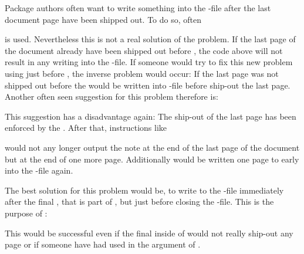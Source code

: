 \begin{Declaration}
\end{Declaration}%
Package authors often want to write something into the -file after
the last document page have been shipped out. To do so, often
\begin{lstcode}
  \AtEndDocument{%
    \if@filesw
      \write\@auxout{%
        \protect\writethistoaux%
      }%
    \fi
  } 
\end{lstcode}
is used. Nevertheless this is not a real solution of the problem. If the last
page of the document already have been shipped out before
, the code above will not result in any
writing into the -file. If someone would try to fix this new problem
using  just before , the inverse problem would
occur: If the last page was not shipped out before
 the  would be written
into -file before ship-out the last page. Another often seen
suggestion for this problem therefore is:
\begin{lstcode}
  \AtEndDocument{%
    \if@filesw
      \clearpage
      \immediate\write\@auxout{%
        \protect\writethistoaux%
      }%
    \fi
  } 
\end{lstcode}
This suggestion has a disadvantage again: The ship-out of the last page has
been enforced by the . After that, instructions like
\begin{lstcode}
\end{lstcode}
would not any longer output the note at the end of the last page of the
document but at the end of one more page. Additionally 
would be written one page to early into the -file again.

The best solution for this problem would be, to write to the -file
immediately after the final , that is part of
, but just before closing the
-file. This is the purpose of :
\begin{lstcode}
  \BeforeClosingMainAux{%
    \if@filesw
      \immediate\write\@auxout{%
        \protect\writethistoaux%
      }%
    \fi
  }
\end{lstcode}
This would be successful even if the final  inside of
 would not really ship-out any page or if
someone have had used  in the argument of
.

